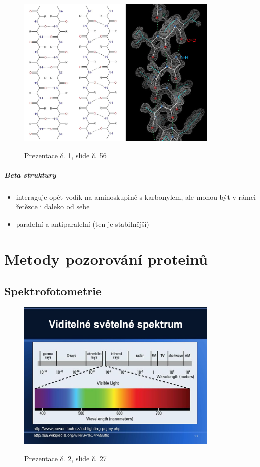 \documentclass[DIV=8]{scrreprt}
\begin{document}
\begin{figure}
    \caption{Prezentace č. 1, slide č. 56}
    \includegraphics[width=0.85\textwidth]{slides-1/slide-56.jpg}
    \centering
    \label{slides-1-slide-56}
\end{figure}

\paragraph{Beta struktury}
\begin{itemize}[nosep]
    \item interaguje opět vodík na aminoskupině s karbonylem, ale mohou být v rámci řetězce i daleko od sebe
    \item paralelní a antiparalelní (ten je stabilnější)
\end{itemize}



\chapter{Metody pozorování proteinů} \label{Metody pozorování proteinů}


\section{Spektrofotometrie} \label{Spektrofotometrie}


\begin{figure}
    \caption{Prezentace č. 2, slide č. 27}
    \includegraphics[width=0.85\textwidth]{slides-2/slide-27.jpg}
    \centering
    \label{slides-2-slide-27}
\end{figure}
\end{document}
